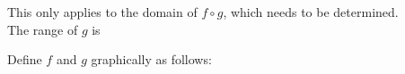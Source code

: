 \documentclass{ximera}
\begin{document}
\begin{observation}


This only applies to the domain of $f \circ g$, which needs to be determined. \\



The range of $g$ is 




\end{observation}


































































































Define $f$ and $g$ graphically as follows:
\end{document}
